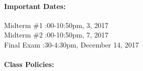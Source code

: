\documentclass[11pt, a4paper]{article}
\begin{document}
\paragraph{Important Dates:}
\begin{center} \begin{minipage}{3.8in}
\begin{flushleft}
Midterm \#1      :00-10:50pm, 3, 2017 \\
Midterm \#2      :00-10:50pm, 7, 2017\\
Final Exam       :30-4:30pm, December 14, 2017\\
\end{flushleft}
\end{minipage}
\end{center}

\paragraph{Class Policies:}
\end{document}
